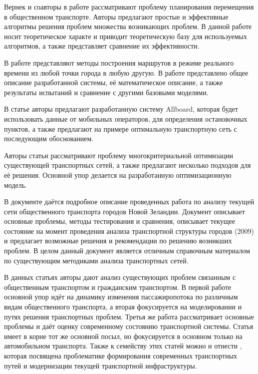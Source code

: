 Вернек и соавторы в работе \cite{bib:25} рассматривают проблему планирования перемещения в общественном 
транспорте. Авторы предлагают простые и эффективные алгоритмы решения проблем множества возникающих проблем.
В данной работе носит теоретическое характе и приводит теоретическую базу для используемых алгоритмов, а 
также представляет сравнение их эффективности.

В работе \cite{bib:27} представляют методы построения маршрутов в режиме реального времени из любой точки 
города в любую другую. В работе представлено общее описание разработанной системы, её математическое 
описание, а также результаты испытаний и сравнение с другими базовыми моделями.

В статье \cite{bib:28} авторы предлагают разработанную систему Allboard, которая будет использовать данные 
от мобильных операторов, для определения остановочных пунктов, а также предлагают на примере оптимальную 
транспортную сеть с последующим обоснованием. 

Авторы статьи \cite{bib:29} рассматривают проблему многокритериальной оптимизации существующей транспортных 
сетей, а также предлагают несколько подходов для её решения. Основной упор делается на разработанную 
оптимизационную модель.

В документе \cite{bib:30} даётся подробное описание проведенных работа по анализу текущей сети общественного 
транспорта городов Новой Зеландии. Документ описывает основные проблемы, методы тестирования и сравнения, 
описывает текущее состояние на момент проведения анализа транспортной структуры городов (2009) и предлагает 
возможные решения и рекомендации по решению возникших проблем. В целом данный документ является отличным 
справочным материалом по существующим методиками анализа транспортных сетей.

В данных статьях \cite{bib:31,bib:32,bib:34} авторы дают анализ существующих проблем связанным с 
общественным транспортом и гражданским транспортом. В первой работе основной упор идёт на динамику изменения 
пассажиропотока по различным видам общественного транспорта, а вторая фокусируется на моделировании и 
путях решения транспортных проблем. Третья же работа рассматривает основные проблемы и даёт оценку 
современному состоянию транспортной системы. Статья \cite{bib:39} имеет в корне тот же основной 
посыл, но фокусируется в основном только на автомобильном транспорта. Также к семейству этих статей можно и 
отнести \cite{bib:40}, которая посвящена проблематике формирования современных транспортных путей и 
модернизации текущей транспортной инфраструктуры.

